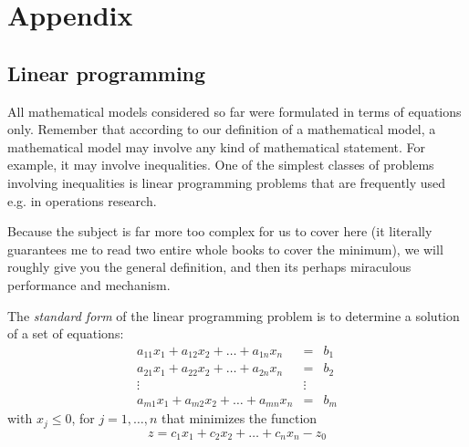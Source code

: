 \section{Appendix}
\subsection{Linear programming}
All mathematical models considered so far were formulated in terms of equations only. Remember that according to our definition of a mathematical model, a mathematical model may involve any kind of mathematical statement. For example, it may involve inequalities. One of the simplest classes of problems involving inequalities is linear programming problems that are frequently used e.g. in operations research.

Because the subject is far more too complex for us to cover here (it literally guarantees me to read two entire whole books to cover the minimum), we will roughly give you the general definition, and then its perhaps miraculous performance and mechanism. 

\begin{definition}
    The \textit{standard form} of the linear programming problem is to determine a solution of a set of equations:
    \begin{equation}
        \begin{matrix}
            a_{11}x_1 + a_{12}x_{2} + \dots + a_{1n}x_{n} & = & b_{1}\\
            a_{21}x_1 + a_{22}x_{2} + \dots + a_{2n}x_{n} & = & b_{2}\\
            \vdots & \vdots & \\
            a_{m1}x_1 + a_{m2}x_{2} + \dots + a_{mn}x_{n} & = & b_{m}
        \end{matrix}
    \end{equation}
    with $x_{j}\leq 0$, for $j=1,\dots,n$ that minimizes the function 
    \begin{equation}
        z = c_{1}x_{1} + c_{2}x_{2} + \dots + c_{n}x_{n} - z_{0}
    \end{equation}
\end{definition}

